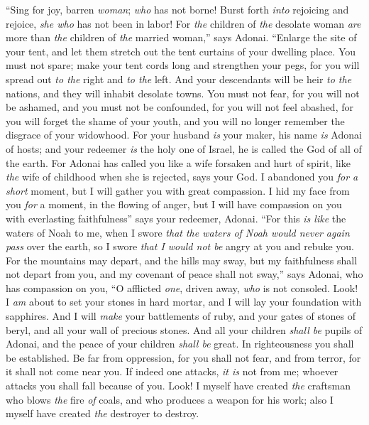 \begin{biblechapter} %
 “Sing for joy, barren \textit{woman}; \textit{who} has not borne! 
Burst forth \textit{into} rejoicing and rejoice, \textit{she who} has not been in labor! 
For \textit{the} children of \textit{the} desolate woman \textit{are} more than \textit{the} children of \textit{the} married woman,” says Adonai.
\verse “Enlarge the site of your tent, 
and let them stretch out the tent curtains of your dwelling place. 
You must not spare; make your tent cords long 
and strengthen your pegs,
\verse for you will spread out \textit{to the} right and \textit{to the} left. 
And your descendants will be heir \textit{to the} nations, 
and they will inhabit desolate towns.
\verse You must not fear, for you will not be ashamed, 
and you must not be confounded, for you will not feel abashed, 
for you will forget the shame of your youth, 
and you will no longer remember the disgrace of your widowhood.
\verse For your husband \textit{is} your maker, his name \textit{is} Adonai of hosts; 
and your redeemer \textit{is} the holy one of Israel, he is called the God of all of the earth.
\verse For Adonai has called you like a wife forsaken and hurt of spirit, 
like \textit{the} wife of childhood when she is rejected, says your God.
\verse I abandoned you \textit{for a short} moment, 
but I will gather you with great compassion.
\verse I hid my face from you \textit{for} a moment, in the flowing of anger, 
but I will have compassion on you with everlasting faithfulness” says your redeemer, Adonai.
\verse “For this \textit{is like} the waters of Noah to me, 
when I swore \textit{that the waters of Noah would never again pass} over the earth, 
so I swore \textit{that I would not be} angry at you and rebuke you.
\verse For the mountains may depart, 
and the hills may sway, 
but my faithfulness shall not depart from you, 
and my covenant of peace shall not sway,” 
says Adonai, who has compassion on you,
\verse “O afflicted \textit{one}, driven away, \textit{who} is not consoled. 
Look! I \textit{am} about to set your stones in hard mortar, 
and I will lay your foundation with sapphires.
\verse And I will \textit{make} your battlements of ruby, 
and your gates of stones of beryl, 
and all your wall of precious stones.
\verse And all your children \textit{shall be} pupils of Adonai, 
and the peace of your children \textit{shall be} great.
\verse In righteousness you shall be established.
\verse Be far from oppression, for you shall not fear, 
and from terror, for it shall not come near you.
\verse If indeed one attacks, \textit{it is} not from me; 
whoever attacks you shall fall because of you.
\verse Look! I myself have created \textit{the} craftsman who blows \textit{the} fire \textit{of} coals, 
and who produces a weapon for his work; 
also I myself have created \textit{the} destroyer to destroy.
\end{biblechapter}

